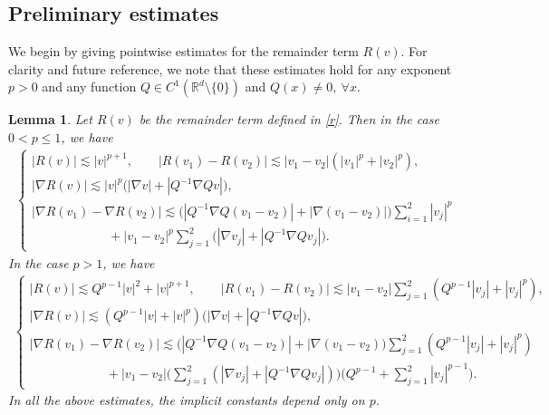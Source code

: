 \documentclass[12pt]{amsart}
\newcommand{\R}{\mathbb R}
\newcommand{\lsm}{\lesssim}
\newtheorem{lemma}[theorem]{Lemma}
\begin{document}
\subsection{Preliminary estimates}

   We begin by giving pointwise estimates for the remainder term $R(v)$. For clarity and future reference, we note that these estimates hold for any exponent $p>0$ and any function $Q\in C^1 (\R^d \setminus \{0\})$ and $Q(x)\neq 0, \ \forall x$. 


\begin{lemma}\label{lm:rv} Let $R(v)$ be the remainder term defined in \eqref{r}. Then in the case $0<p\le 1$, we have
\begin{align}\label{R1}
\begin{cases}
|R(v)|\lsm |v|^{p+1}, \qquad |R(v_1)-R(v_2)|\lsm |v_1-v_2|(|v_1|^p+|v_2|^p), \\
|\nabla R(v)|\lsm |v|^p \bigl(|\nabla v|+|Q^{-1}\nabla Q v|\bigr),\\
|\nabla R(v_1)-\nabla R(v_2)|\lsm  \bigl(|Q^{-1}\nabla Q (v_1-v_2)|+|\nabla (v_1-v_2)|\bigr)\sum_{i=1}^2 |v_j|^p\\
\qquad \qquad\qquad+|v_1-v_2|^p\sum_{j=1}^2\bigl(|\nabla v_j|+|Q^{-1}\nabla Q v_j|\bigr). 
\end{cases}
\end{align}
In the case $p>1$, we have
\begin{align}\label{R2}
\begin{cases}
|R(v)|\lsm Q^{p-1}|v|^2+ |v|^{p+1}, \qquad |R(v_1)-R(v_2)|\lsm |v_1-v_2|\sum_{j=1}^2(Q^{p-1}|v_j|+|v_j|^p), \\
|\nabla R(v)|\lsm (Q^{p-1}|v|+|v|^p) \bigl(|\nabla v|+|Q^{-1}\nabla Q v|\bigr),\\
|\nabla R(v_1)-\nabla R(v_2)|\lsm  \bigl(|Q^{-1}\nabla Q (v_1-v_2)|+|\nabla (v_1-v_2)\bigr)\sum_{j=1}^2(Q^{p-1}|v_j|+ |v_j|^p)\\
\qquad \qquad\qquad+|v_1-v_2|\big(\sum_{j=1}^2 (|\nabla v_j|  +|Q^{-1}\nabla Q v_j|)\big)
\bigl(Q^{p-1}+\sum_{j=1}^2|v_j|^{p-1}\bigr). 
\end{cases}
\end{align}
In all the above estimates, the implicit constants depend only on $p$. 
\end{lemma}
\end{document}
